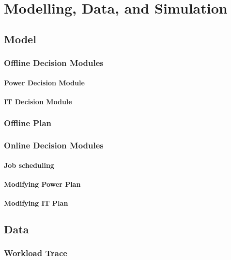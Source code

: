 \chapter{Modelling, Data, and Simulation}
\label{cha:model}

\section{Model}

\subsection{Offline Decision Modules}

\subsubsection{Power Decision Module}

\subsubsection{IT Decision Module}

\subsection{Offline Plan}

\subsection{Online Decision Modules}

\subsubsection{Job scheduling}

\subsubsection{Modifying Power Plan}

\subsubsection{Modifying IT Plan}

\section{Data}

\subsection{Workload Trace}

